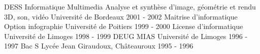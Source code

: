 \begin{cvhonors}
  \cvhonor
    {DESS Informatique Multimedia}
 	{Analyse et synthèse d'image, géométrie et rendu 3D, son, vidéo}
    {Université de Bordeaux}
    {2001 - 2002}
  \cvhonor
    {Maitrise d'informatique}
    {Option infographie}
    {Université de Poitiers}
    {1999 - 2000}
  \cvhonor
    {License d'informatique}
    {}
    {Université de Limoges}
    {1998 - 1999}
  \cvhonor
    {DEUG MIAS}
    {}
    {Université de Limoges}
    {1996 - 1997}
  \cvhonor
    {Bac S}
    {}
    {Lycée Jean Giraudoux, Châteauroux}
    {1995 - 1996}
    {}
\end{cvhonors}
